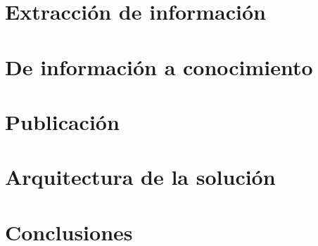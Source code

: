 \documentclass[a4paper,11pt,final]{book}
\begin{document}
 




\newpage
{}
\pagestyle{fancy} 
\tableofcontents






 

\part{Extracción de información}

	




\part{De información a conocimiento}







\part{Publicación}

%



\part{Arquitectura de la solución}





%



\part{Conclusiones}
 			
\end{document}

